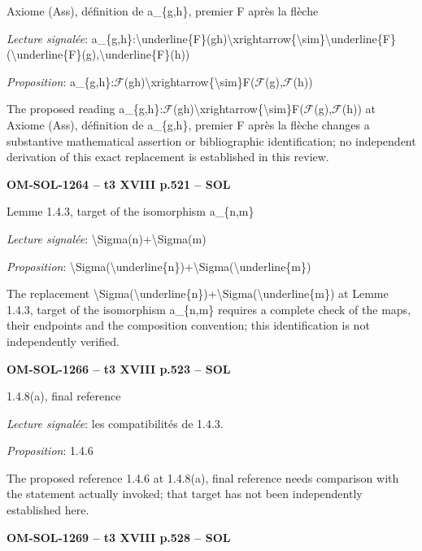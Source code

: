 Axiome (Ass), définition de a\_\{g,h\}, premier F après la flèche\par
\emph{Lecture signalée}: a\_\{g,h\}:\textbackslash{}underline\{F\}(gh)\textbackslash{}xrightarrow\{\textbackslash{}sim\}\textbackslash{}underline\{F\}(\textbackslash{}underline\{F\}(g),\textbackslash{}underline\{F\}(h))\par
\emph{Proposition}: a\_\{g,h\}:\ensuremath{\mathcal{F}}(gh)\textbackslash{}xrightarrow\{\textbackslash{}sim\}F(\ensuremath{\mathcal{F}}(g),\ensuremath{\mathcal{F}}(h))\par
The proposed reading a\_\{g,h\}:\ensuremath{\mathcal{F}}(gh)\textbackslash{}xrightarrow\{\textbackslash{}sim\}F(\ensuremath{\mathcal{F}}(g),\ensuremath{\mathcal{F}}(h)) at Axiome (Ass), définition de a\_\{g,h\}, premier F après la flèche changes a substantive mathematical assertion or bibliographic identification; no independent derivation of this exact replacement is established in this review.\par
\par\noindent\textbf{OM-SOL-1264 -- t3 XVIII p.521 -- SOL}\par
Lemme 1.4.3, target of the isomorphism a\_\{n,m\}\par
\emph{Lecture signalée}: \textbackslash{}Sigma(n)+\textbackslash{}Sigma(m)\par
\emph{Proposition}: \textbackslash{}Sigma(\textbackslash{}underline\{n\})+\textbackslash{}Sigma(\textbackslash{}underline\{m\})\par
The replacement \textbackslash{}Sigma(\textbackslash{}underline\{n\})+\textbackslash{}Sigma(\textbackslash{}underline\{m\}) at Lemme 1.4.3, target of the isomorphism a\_\{n,m\} requires a complete check of the maps, their endpoints and the composition convention; this identification is not independently verified.\par
\par\noindent\textbf{OM-SOL-1266 -- t3 XVIII p.523 -- SOL}\par
1.4.8(a), final reference\par
\emph{Lecture signalée}: les compatibilités de 1.4.3.\par
\emph{Proposition}: 1.4.6\par
The proposed reference 1.4.6 at 1.4.8(a), final reference needs comparison with the statement actually invoked; that target has not been independently established here.\par
\par\noindent\textbf{OM-SOL-1269 -- t3 XVIII p.528 -- SOL}\par
